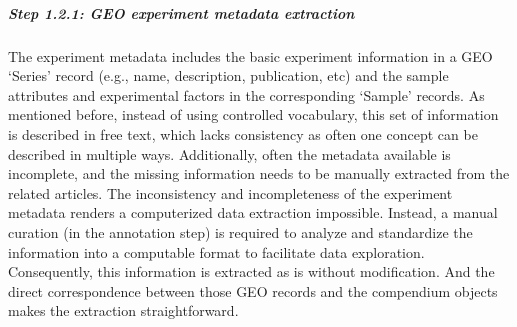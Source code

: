 \subparagraph{Step 1.2.1: GEO experiment metadata extraction}
%
The experiment metadata includes the basic experiment information in a GEO 
`Series' record (e.g., name, description, publication, etc) and the sample 
attributes and experimental factors in the corresponding `Sample' records.
%
As mentioned before, instead of using controlled vocabulary, this set of
information is described in free text, which lacks consistency as often one
concept can be described in multiple ways.
%
Additionally, often the metadata available is incomplete, and the missing
information needs to be manually extracted from the related articles.
%
The inconsistency and incompleteness of the experiment metadata renders a
computerized data extraction impossible.  Instead, a manual curation (in the
annotation step) is required to analyze and standardize the information into
a computable format to facilitate data exploration.
%
Consequently, this information is extracted as is without modification.
%
And the direct correspondence between those GEO records and the compendium
objects makes the extraction straightforward.








